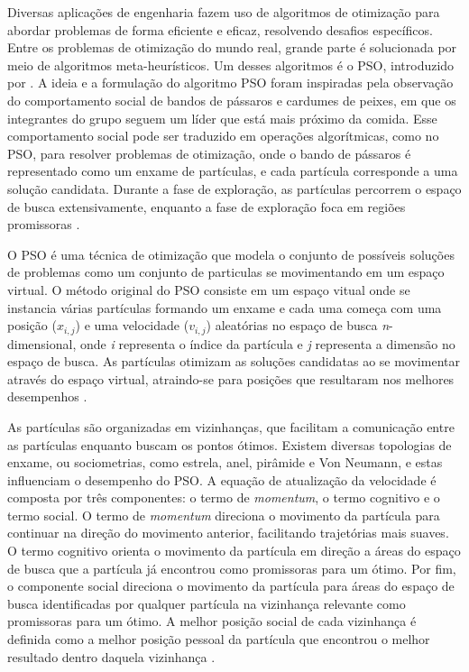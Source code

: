 \documentclass{iftex2024}
\begin{document}
Diversas aplicações de engenharia fazem uso de algoritmos de otimização para abordar problemas de forma eficiente 
e eficaz, resolvendo desafios específicos. Entre os problemas de otimização do mundo real, grande parte é solucionada 
por meio de algoritmos meta-heurísticos. Um desses algoritmos é o PSO, introduzido por \textcite{488968}. A ideia e a formulação do algoritmo PSO foram inspiradas 
pela observação do comportamento social de bandos de pássaros e cardumes de peixes, em que os integrantes do grupo seguem 
um líder que está mais próximo da comida. Esse comportamento social pode ser traduzido em operações algorítmicas, como 
no PSO, para resolver problemas de otimização, onde o bando de pássaros é representado como um enxame de partículas, 
e cada partícula corresponde a uma solução candidata. Durante a fase de exploração, as partículas percorrem o espaço 
de busca extensivamente, enquanto a fase de exploração foca em regiões promissoras \cite{WOS:000986168700001}.

O PSO é uma técnica de otimização que modela o conjunto de possíveis soluções de problemas como um conjunto de particulas
se movimentando em um espaço virtual. O método original do PSO consiste em 
um espaço vitual onde se instancia várias partículas formando um enxame e cada uma começa com uma
posição ($x_{i,j}$) e uma velocidade ($v_{i,j}$) aleatórias no espaço de busca \textit{n}-dimensional, onde \textit{i}
representa o índice da partícula e \textit{j} representa a dimensão no espaço de busca. As partículas
otimizam as soluções candidatas ao se movimentar através do espaço virtual, atraindo-se
para posições que resultaram nos melhores desempenhos \cite{WOS:000233683900013}.

As partículas são organizadas em vizinhanças, que facilitam a comunicação
entre as partículas enquanto buscam os pontos ótimos. Existem diversas topologias de enxame, ou sociometrias, como
estrela, anel, pirâmide e Von Neumann, e estas influenciam o desempenho do PSO. A
equação de atualização da velocidade é composta por três componentes: o termo de
\textit{momentum}, o termo cognitivo e o termo social. O termo de \textit{momentum} direciona o
movimento da partícula para continuar na direção do movimento anterior, facilitando
trajetórias mais suaves. O termo cognitivo orienta o movimento da partícula em direção a
áreas do espaço de busca que a partícula já encontrou como promissoras para um ótimo.
Por fim, o componente social direciona o movimento da partícula para áreas do espaço de
busca identificadas por qualquer partícula na vizinhança relevante como promissoras para
um ótimo. A melhor posição social de cada vizinhança é definida como a melhor posição
pessoal da partícula que encontrou o melhor resultado dentro daquela vizinhança \cite{math11132980}.
\end{document}
